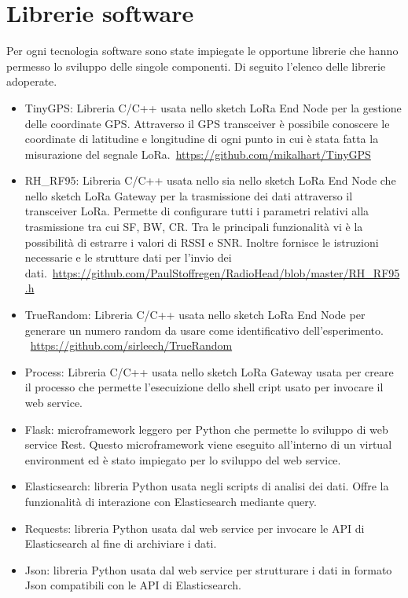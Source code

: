 \documentclass[12pt,a4paper,openright,twoside]{report}
\begin{document}
\section{Librerie software}
Per ogni tecnologia software sono state impiegate le opportune librerie che hanno permesso lo sviluppo delle singole componenti. 
Di seguito l'elenco delle librerie adoperate.
\begin{itemize}
    \item TinyGPS: Libreria C/C++ usata nello sketch LoRa End Node per la gestione delle coordinate GPS. Attraverso il GPS transceiver è possibile conoscere le coordinate di latitudine e longitudine di ogni punto in cui \`e stata fatta la misurazione del segnale LoRa.\
    \url{https://github.com/mikalhart/TinyGPS}
    \item RH\_RF95: Libreria C/C++ usata nello sia nello sketch LoRa End Node che nello sketch LoRa Gateway per la trasmissione dei dati attraverso il transceiver LoRa. Permette di configurare tutti i parametri relativi alla trasmissione tra cui SF, BW, CR. Tra le principali funzionalit\`a vi \`e la possibilit\`a di estrarre i valori di RSSI e SNR. Inoltre fornisce le istruzioni necessarie e le strutture dati per l'invio dei dati.\ 
    \url{https://github.com/PaulStoffregen/RadioHead/blob/master/RH_RF95.h}
    \item TrueRandom: Libreria C/C++ usata nello sketch LoRa End Node per generare un numero random da usare come identificativo dell'esperimento. \ 
    \url{https://github.com/sirleech/TrueRandom}
    \item Process: Libreria C/C++ usata nello sketch LoRa Gateway usata per creare il processo che permette l'esecuizione dello shell cript usato per invocare il web service.
    \item Flask: microframework leggero per Python che permette lo sviluppo di web service Rest. Questo microframework viene eseguito all'interno di un virtual environment ed \`e stato impiegato per lo sviluppo del web service.
    \item Elasticsearch: libreria Python usata negli scripts di analisi dei dati. Offre la funzionalit\`a di interazione con Elasticsearch mediante query. 
    \item Requests: libreria Python usata dal web service per invocare le API di Elasticsearch al fine di archiviare i dati.
    \item Json: libreria Python usata dal web service per strutturare i dati in formato Json compatibili con le API di Elasticsearch. 
\end{itemize}
\end{document}
